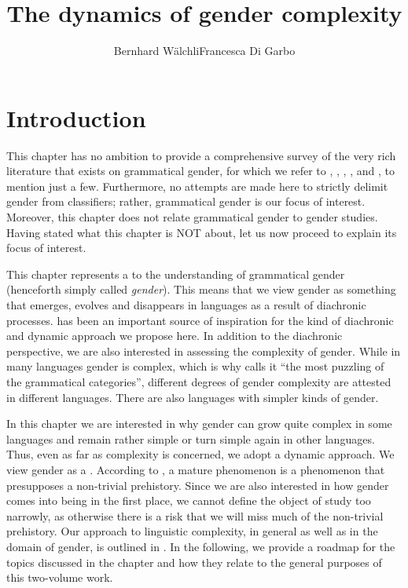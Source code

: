\documentclass[output=collectionpaper]{langsci/langscibook}
\title{The dynamics of gender complexity}
\author{Bernhard Wälchli\lastand Francesca {Di Garbo}\affiliation{Stockholm University}}
\begin{document}
\maketitle

\section{Introduction}
\label{sec:WDG:1}

This chapter has no ambition to provide a comprehensive survey of the very rich literature that exists on grammatical gender, for which we refer to \citet{Corbett1991,Corbett2006,Corbett2014}, \citet{Aikhenvald2000,Aikhenvald2016}, \citet{Kilarski2013}, \citet{Heine1982}, and \citet{Seifart2010}, to mention just a few. Furthermore, no attempts are made here to strictly delimit gender from classifiers; rather, grammatical gender is our focus of interest. Moreover, this chapter does not relate grammatical gender to gender studies. Having stated what this chapter is NOT about, let us now proceed to explain its focus of interest.

This chapter represents a  to the understanding of grammatical gender (henceforth simply called \textit{gender}). This means that we view gender as something that emerges, evolves and disappears in languages as a result of diachronic processes. \cite{Greenberg1978} has been an important source of inspiration for the kind of diachronic and dynamic approach we propose here. In addition to the diachronic perspective, we are also interested in assessing the complexity of gender. While in many languages gender is complex, which is why \cite[1]{Corbett1991} calls it ``the most puzzling of the grammatical categories'', different degrees of gender complexity are attested in different languages. There are also languages with simpler kinds of gender.

In this chapter we are interested in why gender can grow quite complex in some languages and remain rather simple or turn simple again in other languages. Thus, even as far as complexity is concerned, we adopt a dynamic approach. We view gender as a . According to \cite[2]{Dahl2004}, a mature phenomenon is a phenomenon that presupposes a non-trivial prehistory. Since we are also interested in how gender comes into being in the first place, we cannot define the object of study too narrowly, as otherwise there is a risk that we will miss much of the non-trivial prehistory. Our approach to linguistic complexity, in general as well as in the domain of gender, is outlined in . In the following, we provide a roadmap for the topics discussed in the chapter and how they relate to the general purposes of this two-volume work.
\end{document}
